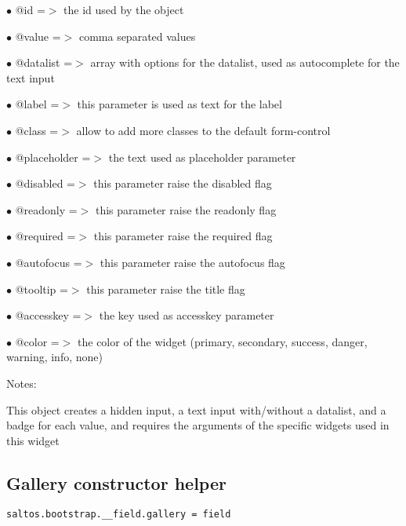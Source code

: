 \documentclass[a4paper]{book}
\begin{document}
\begin{compactitem}
\item[\color{myblue}$\bullet$] @id          =$>$ the id used by the object
\item[\color{myblue}$\bullet$] @value       =$>$ comma separated values
\item[\color{myblue}$\bullet$] @datalist    =$>$ array with options for the datalist, used as autocomplete for the text input
\item[\color{myblue}$\bullet$] @label       =$>$ this parameter is used as text for the label
\item[\color{myblue}$\bullet$] @class       =$>$ allow to add more classes to the default form-control
\item[\color{myblue}$\bullet$] @placeholder =$>$ the text used as placeholder parameter
\item[\color{myblue}$\bullet$] @disabled    =$>$ this parameter raise the disabled flag
\item[\color{myblue}$\bullet$] @readonly    =$>$ this parameter raise the readonly flag
\item[\color{myblue}$\bullet$] @required    =$>$ this parameter raise the required flag
\item[\color{myblue}$\bullet$] @autofocus   =$>$ this parameter raise the autofocus flag
\item[\color{myblue}$\bullet$] @tooltip     =$>$ this parameter raise the title flag
\item[\color{myblue}$\bullet$] @accesskey   =$>$ the key used as accesskey parameter
\item[\color{myblue}$\bullet$] @color       =$>$ the color of the widget (primary, secondary, success, danger, warning, info, none)
\end{compactitem}

Notes:

This object creates a hidden input, a text input with/without a datalist, and a badge for
each value, and requires the arguments of the specific widgets used in this widget

\hypertarget{toc489}{}
\subsection{Gallery constructor helper}

\begin{lstlisting}
saltos.bootstrap.__field.gallery = field
\end{lstlisting}
\end{document}
